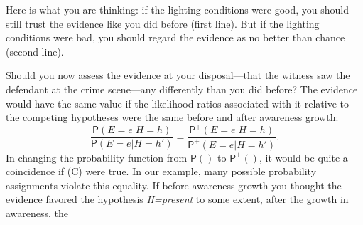 \documentclass[
  11pt,
  dvipsnames,enabledeprecatedfontcommands]{scrartcl}
\newcommand{\pr}[1]{\ensuremath{\mathsf{P}(#1)}}
\newcommand{\ppr}[2]{\ensuremath{\mathsf{P}^{#1}(#2)}}
\begin{document}
\noindent Here is what you are thinking: if the lighting conditions were
good, you should still trust the evidence like you did before (first
line). But if the lighting conditions were bad, you should regard the
evidence as no better than chance (second line).

Should you now assess the evidence at your disposal---that the witness
saw the defendant at the crime scene---any differently than you did
before? The evidence would have the same value if the likelihood ratios
associated with it relative to the competing hypotheses were the same
before and after awareness growth:
\[\frac{\pr{E=e \vert H=h}}{\pr{E=e \vert H=h'}}= \frac{\ppr{+}{E=e \vert H=h}}{\ppr{+}{E=e \vert H=h'}} \tag{C}.\]
In changing the probability function from \(\pr{}\) to \(\ppr{+}{}\), it
would be quite a coincidence if (C) were true. In our example, many
possible probability assignments violate this equality. If before
awareness growth you thought the evidence favored the hypothesis
\textit{H=present} to some extent, after the growth in awareness, the
\end{document}
